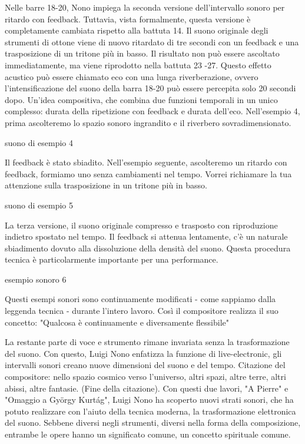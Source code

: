 Nelle barre 18-20, Nono impiega la seconda versione dell'intervallo sonoro per ritardo con feedback. Tuttavia, vista formalmente, questa versione è completamente cambiata rispetto alla battuta 14. Il suono originale degli strumenti di ottone viene di nuovo ritardato di tre secondi con un feedback e una trasposizione di un tritone più in basso. Il risultato non può essere ascoltato immediatamente, ma viene riprodotto nella battuta 23 -27. Questo effetto acustico può essere chiamato eco con una lunga riverberazione, ovvero l'intensificazione del suono della barra 18-20 può essere percepita solo 20 secondi dopo. Un'idea compositiva, che combina due funzioni temporali in un unico complesso: durata della ripetizione con feedback e durata dell'eco. Nell'esempio 4, prima ascolteremo lo spazio sonoro ingrandito e il riverbero sovradimensionato.

suono di esempio 4

Il feedback è stato sbiadito. Nell'esempio seguente, ascolteremo un ritardo con feedback, formiamo uno senza cambiamenti nel tempo. Vorrei richiamare la tua attenzione sulla trasposizione in un tritone più in basso.

suono di esempio 5

La terza versione, il suono originale compresso e trasposto con riproduzione indietro spostato nel tempo. Il feedback si attenua lentamente, c'è un naturale sbiadimento dovuto alla dissoluzione della densità del suono. Questa procedura tecnica è particolarmente importante per una performance.

esempio sonoro 6

Questi esempi sonori sono continuamente modificati - come sappiamo dalla leggenda tecnica - durante l'intero lavoro. Così il compositore realizza il suo concetto: "Qualcosa è continuamente e diversamente flessibile"

La restante parte di voce e strumento rimane invariata senza la trasformazione del suono. Con questo, Luigi Nono enfatizza la funzione di live-electronic, gli intervalli sonori creano nuove dimensioni del suono e del tempo. Citazione del compositore: nello spazio cosmico verso l'universo, altri spazi, altre terre, altri abissi, altre fantasie. (Fine della citazione).
Con questi due lavori, "A Pierre" e "Omaggio a György Kurtág", Luigi Nono ha scoperto nuovi strati sonori, che ha potuto realizzare con l'aiuto della tecnica moderna, la trasformazione elettronica del suono. Sebbene diversi negli strumenti, diversi nella forma della composizione, entrambe le opere hanno un significato comune, un concetto spirituale comune.

